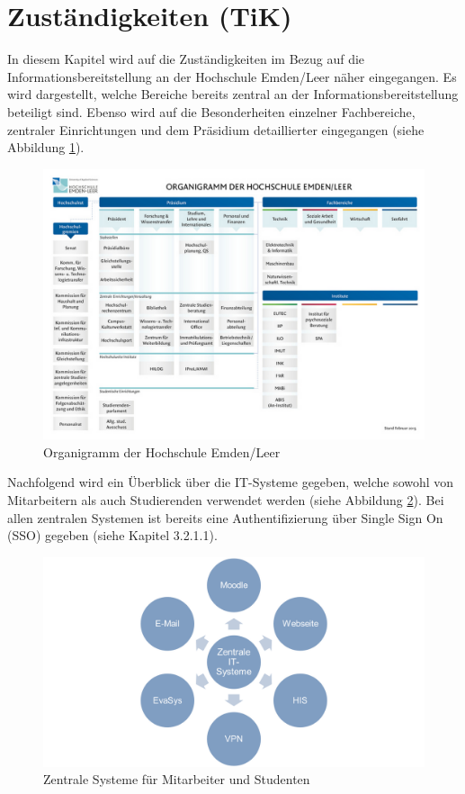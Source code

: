 \section{Zuständigkeiten (TiK)}
\label{section_zustaendigkeiten}
In diesem Kapitel wird auf die Zuständigkeiten im Bezug auf die Informationsbereitstellung an der Hochschule Emden/Leer näher eingegangen. Es wird dargestellt, welche Bereiche bereits zentral an der Informationsbereitstellung beteiligt sind. Ebenso wird auf die Besonderheiten einzelner Fachbereiche, zentraler Einrichtungen und dem Präsidium detaillierter eingegangen (siehe Abbildung \ref{fig_organigramm_HS}). 

\begin{figure}[h!]
	\centering
	\includegraphics[width=14cm]{kapitel/gruppe2/bilder/organigramm_HS}
	\caption{Organigramm der Hochschule Emden/Leer}
	\label{fig_organigramm_HS}
\end{figure}

Nachfolgend wird ein Überblick über die IT-Systeme gegeben, welche sowohl von Mitarbeitern als auch Studierenden verwendet werden (siehe Abbildung  \ref{fig_zentrale_systeme}). Bei allen zentralen Systemen ist bereits eine Authentifizierung über Single Sign On (SSO) gegeben (siehe Kapitel 3.2.1.1).

\begin{figure}[h!]
	\centering
	\includegraphics[width=14cm]{kapitel/gruppe2/bilder/zentrale_systeme}
	\caption{Zentrale Systeme für Mitarbeiter und Studenten}
	\label{fig_zentrale_systeme}
\end{figure}


